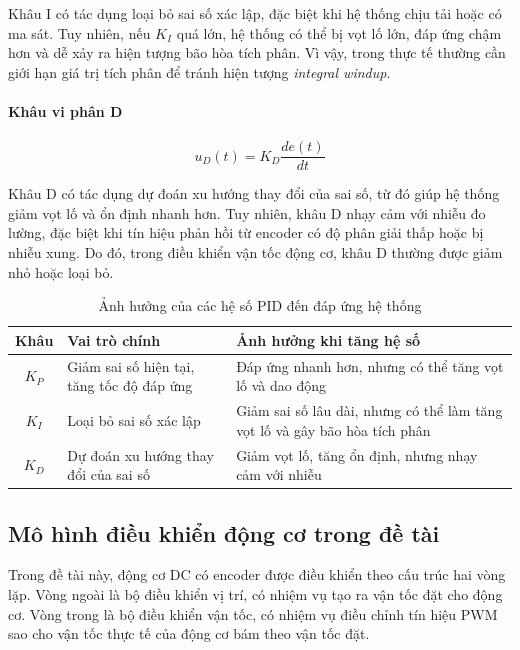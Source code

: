 Khâu I có tác dụng loại bỏ sai số xác lập, đặc biệt khi hệ thống chịu tải hoặc có ma sát. Tuy nhiên, nếu $K_I$ quá lớn, hệ thống có thể bị vọt lố lớn, đáp ứng chậm hơn và dễ xảy ra hiện tượng bão hòa tích phân. Vì vậy, trong thực tế thường cần giới hạn giá trị tích phân để tránh hiện tượng \textit{integral windup}.

\paragraph{Khâu vi phân D}

\begin{equation}
    u_D(t) = K_D \frac{de(t)}{dt}
\end{equation}

Khâu D có tác dụng dự đoán xu hướng thay đổi của sai số, từ đó giúp hệ thống giảm vọt lố và ổn định nhanh hơn. Tuy nhiên, khâu D nhạy cảm với nhiễu đo lường, đặc biệt khi tín hiệu phản hồi từ encoder có độ phân giải thấp hoặc bị nhiễu xung. Do đó, trong điều khiển vận tốc động cơ, khâu D thường được giảm nhỏ hoặc loại bỏ.

\begin{table}[H]
\centering
\caption{Ảnh hưởng của các hệ số PID đến đáp ứng hệ thống}
\label{tab:pid_effect}
\begin{tabular}{|c|p{5cm}|p{5cm}|}
\hline
\textbf{Khâu} & \textbf{Vai trò chính} & \textbf{Ảnh hưởng khi tăng hệ số} \\ \hline
$K_P$ & Giảm sai số hiện tại, tăng tốc độ đáp ứng & Đáp ứng nhanh hơn, nhưng có thể tăng vọt lố và dao động \\ \hline
$K_I$ & Loại bỏ sai số xác lập & Giảm sai số lâu dài, nhưng có thể làm tăng vọt lố và gây bão hòa tích phân \\ \hline
$K_D$ & Dự đoán xu hướng thay đổi của sai số & Giảm vọt lố, tăng ổn định, nhưng nhạy cảm với nhiễu \\ \hline
\end{tabular}
\end{table}

\subsection{Mô hình điều khiển động cơ trong đề tài}

Trong đề tài này, động cơ DC có encoder được điều khiển theo cấu trúc hai vòng lặp. Vòng ngoài là bộ điều khiển vị trí, có nhiệm vụ tạo ra vận tốc đặt cho động cơ. Vòng trong là bộ điều khiển vận tốc, có nhiệm vụ điều chỉnh tín hiệu PWM sao cho vận tốc thực tế của động cơ bám theo vận tốc đặt.

